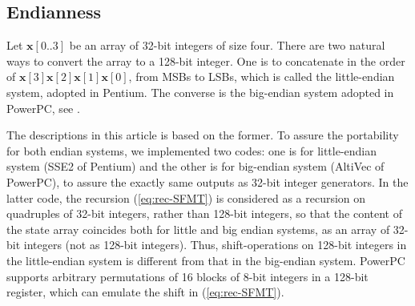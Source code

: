 \documentclass{svmult}
\def\bx{{{\mathbf x}}}
\begin{document}
\subsection{Endianness}
Let $\bx[0..3]$ be an array 
of 32-bit integers of size four.
There are two natural ways to convert the 
array to a 128-bit integer. One is to 
concatenate in the order of
$\bx[3]\bx[2]\bx[1]\bx[0]$, from MSBs to LSBs,
which is called the little-endian system, 
adopted in Pentium.
The converse is the big-endian system
adopted in PowerPC,
see \cite{wiki:endian}.

The descriptions in this article is based on the former.
To assure the portability for both endian systems, 
we implemented two codes: one is for little-endian 
system (SSE2 of Pentium) and the other is for
big-endian system (AltiVec of PowerPC), to 
assure the exactly same outputs 
as 32-bit integer generators.
In the latter code, the recursion (\ref{eq:rec-SFMT}) is considered as 
a recursion on quadruples of 32-bit integers, rather than
128-bit integers, so that the content of the state array 
coincides both for little and big endian systems,
as an array of 32-bit integers (not as 128-bit integers).
Thus, shift-operations on 128-bit integers in the little-endian
system is different from that in the big-endian system.
PowerPC supports arbitrary permutations of 
16 blocks of 8-bit integers in a 128-bit register,
which can emulate the shift in (\ref{eq:rec-SFMT}).
\end{document}
